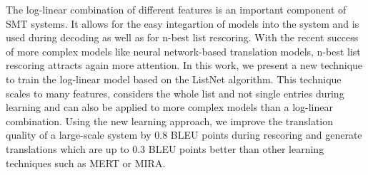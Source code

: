 The log-linear combination of different features is an important component of SMT systems. It allows for the easy integartion of models into the system and is used during decoding as well as for n-best list rescoring. With the recent success of more complex models like neural network-based translation models, n-best list rescoring attracts again more attention. In this work, we present a new technique to train the log-linear model based on the ListNet algorithm. This technique scales to many features, considers the whole list and not single entries during learning and can also be applied to more complex models than a log-linear combination. Using the new learning approach, we improve the translation quality of a large-scale system by 0.8 BLEU points during rescoring and generate translations which are up to 0.3 BLEU points better than other learning techniques such as MERT or MIRA.
